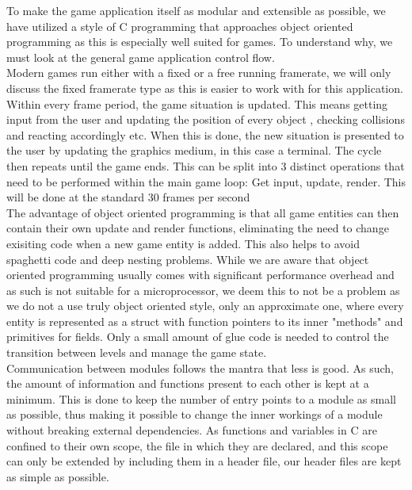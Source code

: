 To make the game application itself as modular and extensible as possible, we have utilized a
style of C programming that approaches object oriented programming as this is especially well
suited for games. To understand why, we must look at the general game application control flow. \\

Modern games run either with a fixed or a free running framerate, we will only discuss the fixed
framerate type as this is easier to work with for this application. Within every frame period, the
game situation is updated. This means getting input from the user and  updating the position of every object
, checking collisions and reacting accordingly etc. When this is done, the new situation is presented to the
 user by updating the graphics medium, in this case a terminal. The cycle then repeats until the game
ends. This can be split into 3 distinct operations that need to be performed within the main game loop:
Get input, update, render. This will be done at the standard 30 frames per second \\

The advantage of object oriented programming is that all game entities can then contain their own
update and render functions, eliminating the need to change exisiting code when a new game entity is added.
This also helps to avoid spaghetti code and deep nesting problems. While we are aware that object oriented
programming usually comes with significant performance overhead and as such is not suitable for a microprocessor,
we deem this to not be a problem as we do not a use truly object oriented style, only an approximate one, where every
entity is represented as a struct with function pointers to its inner "methods" and primitives for fields.
Only a small amount of glue code is needed to control the transition between levels and manage the game state. \\

Communication between modules follows the mantra that less is good. As such, the amount of information and functions
present to each other is kept at a minimum. This is done to keep the number of entry points to a module as small
as possible, thus making it possible to change the inner workings of a module without breaking external dependencies.
As functions and variables in C are confined to their own scope, the file in which they are declared, and this
scope can only be extended by including them in a header file, our header files are kept as simple as possible. \\

